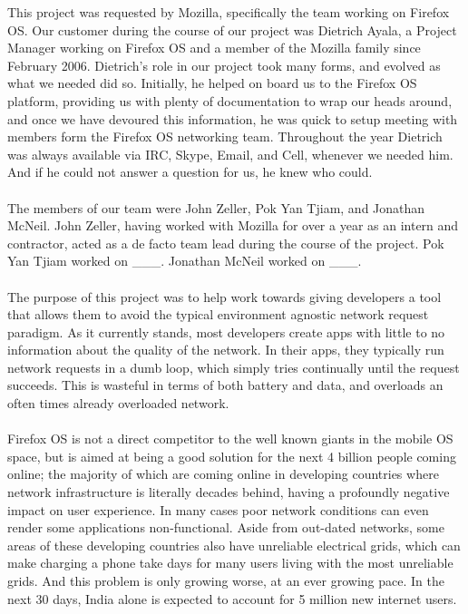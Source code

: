 \documentclass[12pt]{article}
\begin{document}
This project was requested by Mozilla, specifically the team working on Firefox OS. Our customer during the course of our project was Dietrich Ayala, a Project Manager working on Firefox OS and a member of the Mozilla family since February 2006. Dietrich's role in our project took many forms, and evolved as what we needed did so. Initially, he helped on board us to the Firefox OS platform, providing us with plenty of documentation to wrap our heads around, and once we have devoured this information, he was quick to setup meeting with members form the Firefox OS networking team. Throughout the year Dietrich was always available via IRC, Skype, Email, and Cell, whenever we needed him. And if he could not answer a question for us, he knew who could.
\\\\
The members of our team were John Zeller, Pok Yan Tjiam, and Jonathan McNeil. John Zeller, having worked with Mozilla for over a year as an intern and contractor, acted as a de facto team lead during the course of the project. Pok Yan Tjiam worked on \_\_\_. Jonathan McNeil worked on \_\_\_.
\\\\
The purpose of this project was to help work towards giving developers a tool that allows them to avoid the typical environment agnostic network request paradigm. As it currently stands, most developers create apps with little to no information about the quality of the network. In their apps, they typically run network requests in a dumb loop, which simply tries continually until the request succeeds. This is wasteful in terms of both battery and data, and overloads an often times already overloaded network.
\\\\
Firefox OS is not a direct competitor to the well known giants in the mobile OS space, but is aimed at being a good solution for the next 4 billion people coming online; the majority of which are coming online in developing countries where network infrastructure is literally decades behind, having a profoundly negative impact on user experience. In many cases poor network conditions can even render some applications non-functional. Aside from out-dated networks, some areas of these developing countries also have unreliable electrical grids, which can make charging a phone take days for many users living with the most unreliable grids. And this problem is only growing worse, at an ever growing pace. In the next 30 days, India alone is expected to account for 5 million new internet users.
\pagebreak
\end{document}
